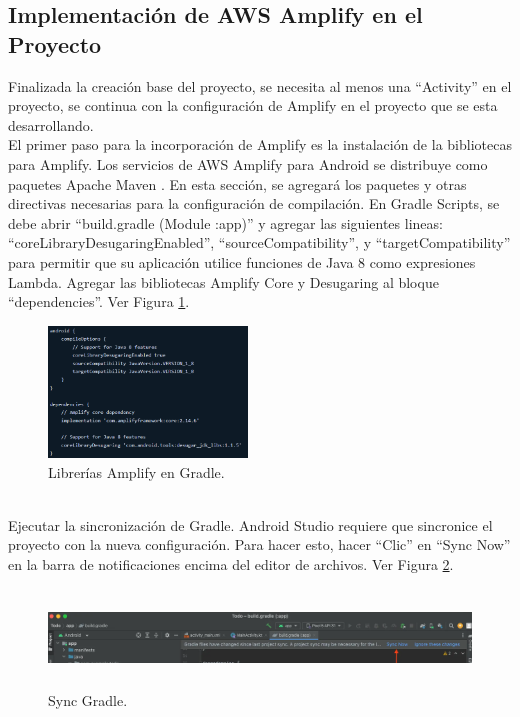 \documentclass[a4paper,10pt, oneside, titlepage]{article}
\begin{document}
	\subsection{Implementación de AWS Amplify en el Proyecto}
	Finalizada la creación base del proyecto, se necesita al menos una ``Activity'' en el proyecto, se continua con la configuración de Amplify en el proyecto que se esta desarrollando. \\\newline
	\indent El primer paso para la incorporación de Amplify es la instalación de la bibliotecas para Amplify. Los servicios de AWS Amplify para Android se distribuye como paquetes Apache Maven \cite{Amplify}. En esta sección, se agregará los paquetes y otras directivas necesarias para la configuración de compilación. En Gradle Scripts, se debe abrir ``build.gradle (Module :app)'' y agregar las siguientes lineas: ``coreLibraryDesugaringEnabled'', ``sourceCompatibility'', y ``targetCompatibility'' para permitir que su aplicación utilice funciones de Java 8 como expresiones Lambda. Agregar las bibliotecas Amplify Core y Desugaring al bloque ``dependencies''. Ver Figura \ref{Librerias_Gradle_Amplify}.
	\begin{figure}[!h]
		\centering
		\includegraphics[width = 1\linewidth, height = 3.5cm]{Librerias_Gradle_Amplify.png}
		\caption{Librerías Amplify en Gradle.}
		\label{Librerias_Gradle_Amplify}
	\end{figure} \\
	\indent Ejecutar la sincronización de Gradle. Android Studio requiere que sincronice el proyecto con la nueva configuración. Para hacer esto, hacer ``Clic'' en ``Sync Now'' en la barra de notificaciones encima del editor de archivos. Ver Figura \ref{Sync_Gradle}.
	\begin{figure}[!h]
		\centering
		\includegraphics[width = 1\linewidth, height = 2.6cm]{Sync_Gradle.png}
		\caption{Sync Gradle.}
		\label{Sync_Gradle}
	\end{figure} \\
\end{document}
